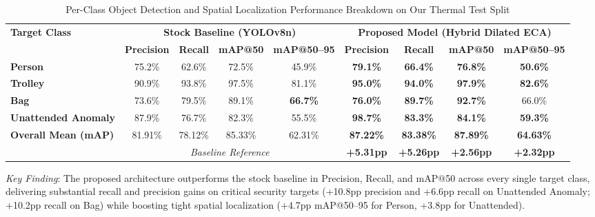 \documentclass[journal,twoside,web]{ieeecolor}
\begin{document}
\begin{table}[t]
\centering
\caption{Per-Class Object Detection and Spatial Localization Performance Breakdown on Our Thermal Test Split}
\label{tab:per_class_breakdown}
\small
\renewcommand{\arraystretch}{1.22}
\setlength{\tabcolsep}{7pt}
\begin{tabular}{l cccc cccc}
\toprule
\multirow{2}{*}{\textbf{Target Class}} & 
\multicolumn{4}{c}{\textbf{Stock Baseline (YOLOv8n)}} & 
\multicolumn{4}{c}{\textbf{Proposed Model (Hybrid Dilated ECA)}} \\
\cmidrule(lr){2-5} \cmidrule(lr){6-9}
& \textbf{Precision} & \textbf{Recall} & \textbf{mAP@50} & \textbf{mAP@50--95} 
& \textbf{Precision} & \textbf{Recall} & \textbf{mAP@50} & \textbf{mAP@50--95} \\
\midrule
\textbf{Person}             & 75.2\% & 62.6\% & 72.5\% & 45.9\% & \textbf{79.1\%} & \textbf{66.4\%} & \textbf{76.8\%} & \textbf{50.6\%} \\
\textbf{Trolley}            & 90.9\% & 93.8\% & 97.5\% & 81.1\% & \textbf{95.0\%} & \textbf{94.0\%} & \textbf{97.9\%} & \textbf{82.6\%} \\
\textbf{Bag}                & 73.6\% & 79.5\% & 89.1\% & \textbf{66.7\%} & \textbf{76.0\%} & \textbf{89.7\%} & \textbf{92.7\%} & 66.0\% \\
\textbf{Unattended Anomaly} & 87.9\% & 76.7\% & 82.3\% & 55.5\% & \textbf{98.7\%} & \textbf{83.3\%} & \textbf{84.1\%} & \textbf{59.3\%} \\
\midrule
\rowcolor{gray!12}
\textbf{Overall Mean (mAP)} & 81.91\% & 78.12\% & 85.33\% & 62.31\% & \textbf{87.22\%} & \textbf{83.38\%} & \textbf{87.89\%} & \textbf{64.63\%} \\
\rowcolor{gray!06}
\multicolumn{1}{l}{\textit{Improvement ($\Delta$)}} & \multicolumn{4}{c}{\textit{Baseline Reference}} & \textbf{+5.31pp} & \textbf{+5.26pp} & \textbf{+2.56pp} & \textbf{+2.32pp} \\
\bottomrule
\end{tabular}
\vspace{1ex}
{\raggedright \footnotesize \textit{Key Finding}: The proposed architecture outperforms the stock baseline in Precision, Recall, and mAP@50 across every single target class, delivering substantial recall and precision gains on critical security targets (+10.8pp precision and +6.6pp recall on Unattended Anomaly; +10.2pp recall on Bag) while boosting tight spatial localization (+4.7pp mAP@50--95 for Person, +3.8pp for Unattended).\par}
\end{table}
\end{document}
